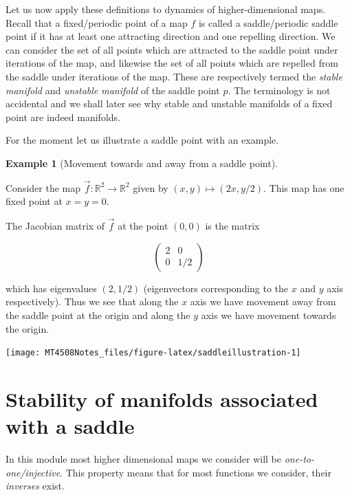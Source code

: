 \documentclass[
  a4paper,
  oneside,
  final]{krantz}
\newcommand{\R}{\mathbb{R}}
\theoremstyle{definition}
\theoremstyle{definition}
\newtheorem{example}{Example}[chapter]
\theoremstyle{definition}
\theoremstyle{definition}
\theoremstyle{remark}
\begin{document}
Let us now apply these definitions to dynamics of higher-dimensional maps. Recall that a fixed/periodic point of a map \(f\) is called a saddle/periodic saddle point if it has at least one attracting direction and one repelling direction. We can consider the set of all points which are attracted to the saddle point under iterations of the map, and likewise the set of all points which are repelled from the saddle under iterations of the map. These are respectively termed the \emph{stable manifold} and \emph{unstable manifold} of the saddle point \(p.\) The terminology is not accidental and we shall later see why stable and unstable manifolds of a fixed point are indeed manifolds.

For the moment let us illustrate a saddle point with an example.

\begin{example}[Movement towards and away from a saddle point]
\protect\hypertarget{exm:repellingandattractingsaddle}{}\label{exm:repellingandattractingsaddle}

Consider the map \(\vec{f}: \R^2 \to \R^2\) given by \((x,y) \mapsto (2x, y/2)\). This map has one fixed point at \(x = y = 0\).

The Jacobian matrix of \(\vec{f}\) at the point \((0,0)\) is the matrix

\[\begin{pmatrix}
  2 & 0 \\
  0 & 1/2
\end{pmatrix} \]

which has eigenvalues \((2, 1/2)\) (eigenvectors corresponding to the \(x\) and \(y\) axis respectively). Thus we see that along the \(x\) axis we have movement away from the saddle point at the origin and along the \(y\) axis we have movement towards the origin.

\begin{center}\texttt{[image: MT4508Notes\_files/figure-latex/saddleillustration-1]} \end{center}

\end{example}

\hypertarget{stabilityofmanifolds}{%
\section{Stability of manifolds associated with a saddle}\label{stabilityofmanifolds}}

In this module most higher dimensional maps we consider will be \emph{one-to-one/injective}. This property means that for most functions we consider, their \emph{inverses} exist.
\end{document}
